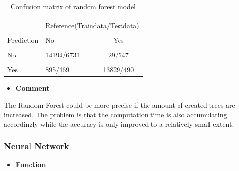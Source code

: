 \begin{figure}
\centering
\end{figure}
\begin{center}
  	\begin{table}[!htbp]
  		\centering  
\begin{tabular}{llc}
	\hline
	\hline\\[-1.8ex]
	& \multicolumn{2}{c}{Reference(Traindata/Testdata)} \\
	\cline{2-3}\\[-1.8ex]
	Prediction & No & Yes \\
	\hline \\[-1.8ex] 
	No & 14194/6731 &29/547 \\ 
	\hline \\[-1.8ex] 
	Yes& 895/469 &13829/490 \\ 
	\hline
	\hline
\end{tabular}  
\caption{Confusion matrix of random forest model} 
\label{tab:confmatrix_rf}
\end{table}
\end{center}  
	\begin{itemize}
  		\item \textbf{Comment}
  	\end{itemize}	
The Random Forest could be more precise if the amount of created trees are increased. The problem is that the computation time is also accumulating accordingly while the accuracy is only improved to a relatively small extent. 
  	\subsubsection{Neural Network}
  	 \begin{itemize}
  		\item \textbf{Function}
  	\end{itemize}
  	
